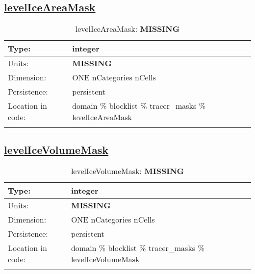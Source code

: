 \subsection[levelIceAreaMask]{\hyperref[sec:var_tab_tracer_masks]{levelIceAreaMask}}
\label{subsec:var_sec_tracer_masks_levelIceAreaMask}
\begin{center}
\begin{longtable}{| p{2.0in} | p{4.0in} |}
        \hline 
        Type: & integer \\
        \hline 
        Units: & {\bf \color{red} MISSING} \\
        \hline 
        Dimension: & ONE nCategories nCells \\
        \hline 
        Persistence: & persistent \\
        \hline 
         Location in code: & domain \% blocklist \% tracer\_masks \% levelIceAreaMask \\
         \hline 
    \caption{levelIceAreaMask: {\bf \color{red} MISSING}}
\end{longtable}
\end{center}
\subsection[levelIceVolumeMask]{\hyperref[sec:var_tab_tracer_masks]{levelIceVolumeMask}}
\label{subsec:var_sec_tracer_masks_levelIceVolumeMask}
\begin{center}
\begin{longtable}{| p{2.0in} | p{4.0in} |}
        \hline 
        Type: & integer \\
        \hline 
        Units: & {\bf \color{red} MISSING} \\
        \hline 
        Dimension: & ONE nCategories nCells \\
        \hline 
        Persistence: & persistent \\
        \hline 
         Location in code: & domain \% blocklist \% tracer\_masks \% levelIceVolumeMask \\
         \hline 
    \caption{levelIceVolumeMask: {\bf \color{red} MISSING}}
\end{longtable}
\end{center}
